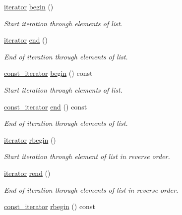 \begin{DoxyCompactItemize}
\mbox{\hyperlink{classsymlist_a66045fbe3d98975e5537092ede8b50df}{iterator}} \mbox{\hyperlink{classsymlist_a525b8d44af5d771fe15916372515cce0}{begin}} ()
\begin{DoxyCompactList}\small\item\em Start iteration through elements of list. \end{DoxyCompactList}\item 
\mbox{\hyperlink{classsymlist_a66045fbe3d98975e5537092ede8b50df}{iterator}} \mbox{\hyperlink{classsymlist_a7283589fa01f79d722f8256d7a6a7883}{end}} ()
\begin{DoxyCompactList}\small\item\em End of iteration through elements of list. \end{DoxyCompactList}\item 
\mbox{\hyperlink{classsymlist_af15c0ca931299054f83d17a1580a5159}{const\+\_\+iterator}} \mbox{\hyperlink{classsymlist_a843d2df09f34079f6547f338b50823cd}{begin}} () const
\begin{DoxyCompactList}\small\item\em Start iteration through elements of list. \end{DoxyCompactList}\item 
\mbox{\hyperlink{classsymlist_af15c0ca931299054f83d17a1580a5159}{const\+\_\+iterator}} \mbox{\hyperlink{classsymlist_a189c41a13b3dd377c113d802258ef418}{end}} () const
\begin{DoxyCompactList}\small\item\em End of iteration through elements of list. \end{DoxyCompactList}\item 
\mbox{\hyperlink{classsymlist_a66045fbe3d98975e5537092ede8b50df}{iterator}} \mbox{\hyperlink{classsymlist_ae5250e0c0c2bedee285f72584ddce29d}{rbegin}} ()
\begin{DoxyCompactList}\small\item\em Start iteration through element of list in reverse order. \end{DoxyCompactList}\item 
\mbox{\hyperlink{classsymlist_a66045fbe3d98975e5537092ede8b50df}{iterator}} \mbox{\hyperlink{classsymlist_a421fc482e62f257a9081e9e1c29d66a6}{rend}} ()
\begin{DoxyCompactList}\small\item\em End of iteration through elements of list in reverse order. \end{DoxyCompactList}\item 
\mbox{\hyperlink{classsymlist_af15c0ca931299054f83d17a1580a5159}{const\+\_\+iterator}} \mbox{\hyperlink{classsymlist_a3779415d5588f9621494f40789841caf}{rbegin}} () const

\end{DoxyCompactItemize}
